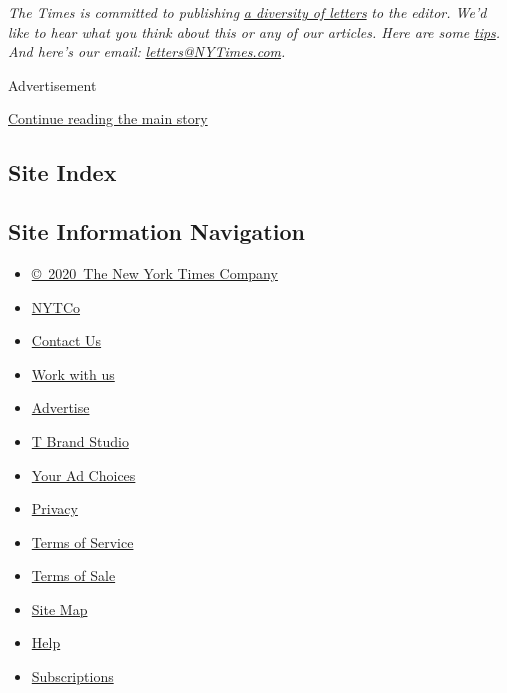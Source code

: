 \emph{The Times is committed to publishing}
\href{https://www.nytimes3xbfgragh.onion/2019/01/31/opinion/letters/letters-to-editor-new-york-times-women.html}{\emph{a
diversity of letters}} \emph{to the editor. We'd like to hear what you
think about this or any of our articles. Here are some}
\href{https://help.nytimes3xbfgragh.onion/hc/en-us/articles/115014925288-How-to-submit-a-letter-to-the-editor}{\emph{tips}}\emph{.
And here's our email:}
\href{mailto:letters@NYTimes.com}{\emph{letters@NYTimes.com}}\emph{.}

Advertisement

\protect\hyperlink{after-bottom}{Continue reading the main story}

\hypertarget{site-index}{%
\subsection{Site Index}\label{site-index}}

\hypertarget{site-information-navigation}{%
\subsection{Site Information
Navigation}\label{site-information-navigation}}

\begin{itemize}
\tightlist
\item
  \href{https://help.nytimes3xbfgragh.onion/hc/en-us/articles/115014792127-Copyright-notice}{©~2020~The
  New York Times Company}
\end{itemize}

\begin{itemize}
\tightlist
\item
  \href{https://www.nytco.com/}{NYTCo}
\item
  \href{https://help.nytimes3xbfgragh.onion/hc/en-us/articles/115015385887-Contact-Us}{Contact
  Us}
\item
  \href{https://www.nytco.com/careers/}{Work with us}
\item
  \href{https://nytmediakit.com/}{Advertise}
\item
  \href{http://www.tbrandstudio.com/}{T Brand Studio}
\item
  \href{https://www.nytimes3xbfgragh.onion/privacy/cookie-policy\#how-do-i-manage-trackers}{Your
  Ad Choices}
\item
  \href{https://www.nytimes3xbfgragh.onion/privacy}{Privacy}
\item
  \href{https://help.nytimes3xbfgragh.onion/hc/en-us/articles/115014893428-Terms-of-service}{Terms
  of Service}
\item
  \href{https://help.nytimes3xbfgragh.onion/hc/en-us/articles/115014893968-Terms-of-sale}{Terms
  of Sale}
\item
  \href{https://spiderbites.nytimes3xbfgragh.onion}{Site Map}
\item
  \href{https://help.nytimes3xbfgragh.onion/hc/en-us}{Help}
\item
  \href{https://www.nytimes3xbfgragh.onion/subscription?campaignId=37WXW}{Subscriptions}
\end{itemize}
